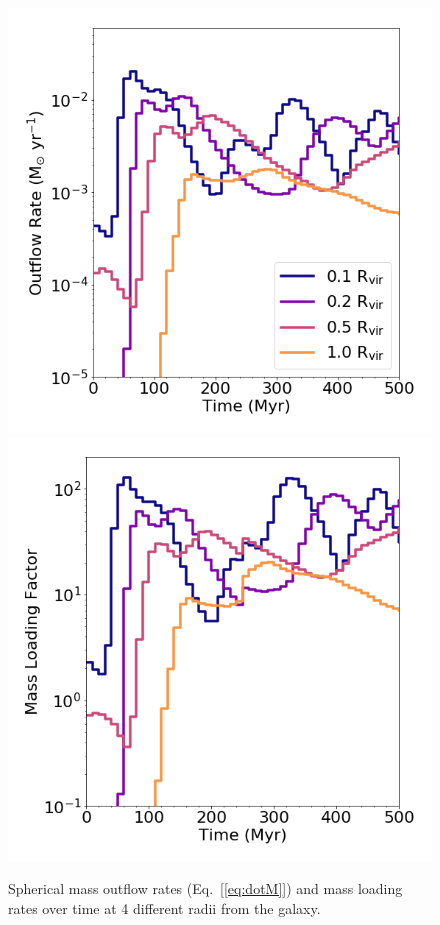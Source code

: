 \begin{figure}
\includegraphics[width=0.475\linewidth]{figures/ch1/total_mass_outflow}
\includegraphics[width=0.475\linewidth]{figures/ch1/total_mass_loading}
\caption{Spherical mass outflow rates (Eq.~[\ref{eq:dotM}]) and mass loading rates over time at 4 different radii from the galaxy.}
\label{ch1:fig:mass_outflow}
\end{figure}

